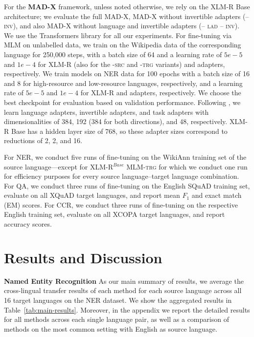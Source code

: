 \documentclass[11pt,a4paper]{article}
\newcommand{\model}[1]{\textsc{MAD-X}}
\newcommand{\mlmtrg}[1]{\textsc{XLM-R$^{Base}$ MLM-trg}}
\begin{document}
For the \textbf{\model{}} framework, unless noted otherwise, we rely on the XLM-R Base architecture; we evaluate the full \model{}, \model{} without invertible adapters (--\textsc{inv}), and also \model{} without language and invertible adapters (-- \textsc{lad} -- \textsc{inv}). We use the Transformers library \cite{Wolf2019transformers} for all our experiments. For fine-tuning via MLM on unlabelled data, we train on the Wikipedia data of the corresponding language for 250,000 steps, with a batch size of 64 and a learning rate of $5e-5$ and $1e-4$ for XLM-R (also for the \textsc{-src} and \textsc{-trg} variants) and adapters,  respectively. We train models on NER data for 100 epochs with a batch size of 16 and 8 for high-resource and low-resource languages, respectively, and a learning rate of $5e-5$ and $1e-4$ for XLM-R and adapters, respectively. We choose the best checkpoint for evaluation based on validation performance. Following \citet{Pfeiffer2020adapterfusion}, we learn language adapters, invertible adapters, and task adapters with dimensionalities of 384, 192 (384 for both directions), and 48, respectively. XLM-R Base has a hidden layer size of 768, so these adapter sizes correspond to reductions of 2, 2, and 16.

For NER, we conduct five runs of fine-tuning on the WikiAnn training set of the source language---except for \mlmtrg{} for which we conduct one run for efficiency purposes for every source language--target language combination. For QA, we conduct three runs of fine-tuning on the English SQuAD training set, evaluate on all XQuAD target languages, and report mean $F_1$ and exact match (EM) scores. For CCR, we conduct three runs of fine-tuning on the respective English training set, evaluate on all XCOPA target languages, and report accuracy scores.

 

\section{Results and Discussion} 
\label{sec:results}

 
\noindent \textbf{Named Entity Recognition}\hspace{0.3mm}
As our main summary of results, we average the cross-lingual transfer results of each method for each source language across all 16 target languages on the NER dataset. We show the aggregated results in Table~\ref{tab:main-results}. Moreover, in the appendix we report the detailed results for all methods across each single language pair, as well as a comparison of methods on the most common setting with English as source language.
\end{document}
